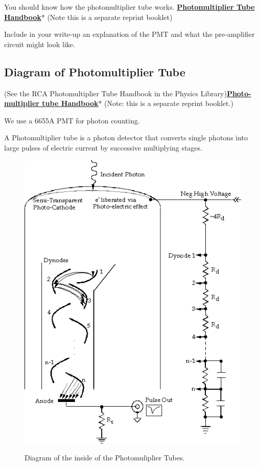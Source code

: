 \documentclass{../lab}
\begin{document}
You should know how the photomultiplier tube works. \href{http://physics111.lib.berkeley.edu/Physics111/Equipment\_Manuals/RCA\_PMT.pdf}{\textbf{Photomultiplier Tube Handbook}}* (Note this is a separate reprint booklet)

Include in your write-up an explanation of the PMT and what the pre-amplifier circuit might look like.

\subsection{Diagram of Photomultiplier Tube}

(See the RCA Photomultiplier Tube Handbook in the Physics Library)\href{http://physics111.lib.berkeley.edu/Physics111/Equipment\_Manuals/RCA\_PMT.pdf}{\textbf{Photo-multiplier tube Handbook}}* (Note: this is a separate reprint booklet.)

We use a 6655A PMT for photon counting.

A Photomultiplier tube is a photon detector that converts single photons into large pulses of electric current by successive multiplying stages.

\begin{figure}[h]
    \centering
    \href{http://experimentationlab.berkeley.edu/sites/default/files/images/BRAimage047.gif}{\includegraphics[width=0.5\linewidth]{images/BRAimage047.png}}
    \caption{Diagram of the inside of the Photomuliplier Tubes.}
    \label{fig:BRAimage047}
\end{figure}
\end{document}
